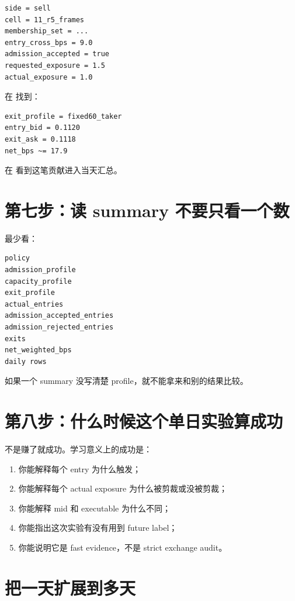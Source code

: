 \begin{lstlisting}
side = sell
cell = 11_r5_frames
membership_set = ...
entry_cross_bps = 9.0
admission_accepted = true
requested_exposure = 1.5
actual_exposure = 1.0
\end{lstlisting}

在  找到：

\begin{lstlisting}
exit_profile = fixed60_taker
entry_bid = 0.1120
exit_ask = 0.1118
net_bps ~= 17.9
\end{lstlisting}

在  看到这笔贡献进入当天汇总。

\section{第七步：读 summary 不要只看一个数}

 最少看：

\begin{lstlisting}
policy
admission_profile
capacity_profile
exit_profile
actual_entries
admission_accepted_entries
admission_rejected_entries
exits
net_weighted_bps
daily rows
\end{lstlisting}

如果一个 summary 没写清楚 profile，就不能拿来和别的结果比较。

\section{第八步：什么时候这个单日实验算成功}

不是赚了就成功。学习意义上的成功是：

\begin{enumerate}[leftmargin=2em]
  \item 你能解释每个 entry 为什么触发；
  \item 你能解释每个 actual exposure 为什么被剪裁或没被剪裁；
  \item 你能解释 mid 和 executable 为什么不同；
  \item 你能指出这次实验有没有用到 future label；
  \item 你能说明它是 fast evidence，不是 strict exchange audit。
\end{enumerate}

\section{把一天扩展到多天}

